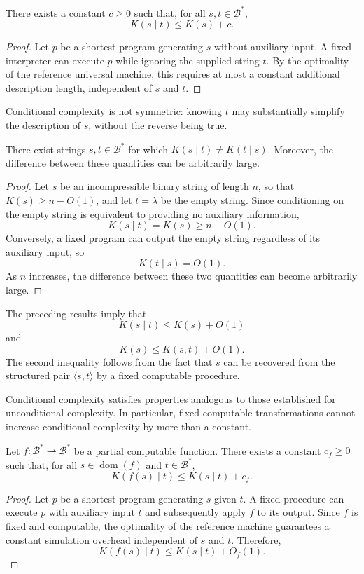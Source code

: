 \begin{proposition}
\label{prop:kolmogorov_conditional}
There exists a constant $c\geq 0$ such that, for all $s,t \in \mathcal{B}^*$,
\[
K(s \mid t) \leq K(s)+c.
\]
\end{proposition}
\begin{proof}
Let $p$ be a shortest program generating $s$ without auxiliary input. A fixed interpreter can execute $p$ while ignoring the supplied string $t$. By the optimality of the reference universal machine, this requires at most a constant additional description length, independent of $s$ and $t$.
\end{proof}

Conditional complexity is not symmetric: knowing $t$ may substantially simplify the description of $s$, without the reverse being true.

\begin{proposition}
\label{prop:conditional-asymmetry}
There exist strings $s,t \in \mathcal{B}^*$ for which $K(s \mid t) \neq K(t \mid s)$. Moreover, the difference between these quantities can be arbitrarily large.
\end{proposition}

\begin{proof}
Let $s$ be an incompressible binary string of length $n$, so that $K(s)\geq n-O(1)$, and let $t=\lambda$ be the empty string. Since conditioning on the empty string is equivalent to providing no auxiliary information,
\[
K(s \mid t)=K(s)\geq n-O(1).
\]
Conversely, a fixed program can output the empty string regardless of its auxiliary input, so
\[
K(t \mid s)=O(1).
\]
As $n$ increases, the difference between these two quantities can become arbitrarily large.
\end{proof}

The preceding results imply that
\[
K(s \mid t)\leq K(s)+O(1)
\]
and
\[
K(s)\leq K(s,t)+O(1).
\]
The second inequality follows from the fact that $s$ can be recovered from the structured pair $\langle s,t\rangle$ by a fixed computable procedure.

Conditional complexity satisfies properties analogous to those established for unconditional complexity. In particular, fixed computable transformations cannot increase conditional complexity by more than a constant.

\begin{proposition}
\label{prop:conditional-transformation}
Let $f:\mathcal{B}^*\rightharpoonup\mathcal{B}^*$ be a partial computable function. There exists a constant $c_f\geq 0$ such that, for all $s\in\operatorname{dom}(f)$ and $t\in\mathcal{B}^*$,
\[
K(f(s)\mid t)\leq K(s\mid t)+c_f.
\]
\end{proposition}
\begin{proof}
Let $p$ be a shortest program generating $s$ given $t$. A fixed procedure can execute $p$ with auxiliary input $t$ and subsequently apply $f$ to its output. Since $f$ is fixed and computable, the optimality of the reference machine guarantees a constant simulation overhead independent of $s$ and $t$. Therefore,
\[
K(f(s)\mid t)\leq K(s\mid t)+O_f(1).
\]
\end{proof}

